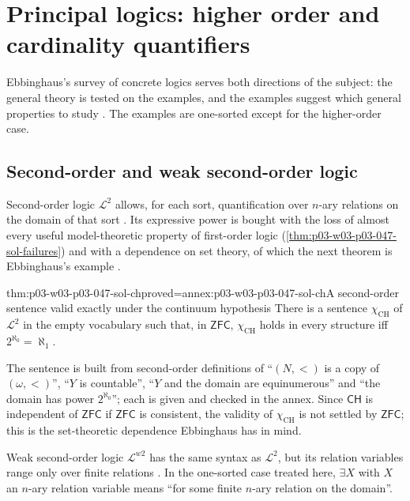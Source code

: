 

\section{Principal logics: higher order and cardinality quantifiers}
\label{sec:p03-w03-p03-047-principal-logics}

Ebbinghaus's survey of concrete logics serves both directions of the
subject: the general theory is tested on the examples, and the examples
suggest which general properties to study
\cite[Ch.~II, \S2, p.~33]{Ebbinghaus1985ExtendedLogics}.  The examples are
one-sorted except for the higher-order case.

\subsection{Second-order and weak second-order logic}

Second-order logic \(\mathscr L^2\) allows, for each sort, quantification
over \(n\)-ary relations on the domain of that sort
\cite[Ch.~II, Definition~2.1.1, p.~33]{Ebbinghaus1985ExtendedLogics}.  Its
expressive power is bought with the loss of almost every useful
model-theoretic property of first-order logic
(\cref{thm:p03-w03-p03-047-sol-failures}) and with a dependence on set
theory, of which the next theorem is Ebbinghaus's example
\cite[Ch.~II, \S2.1, p.~33]{Ebbinghaus1985ExtendedLogics}.

\begin{hbtheorem}{thm:p03-w03-p03-047-sol-ch}{proved=annex:p03-w03-p03-047-sol-ch}{A second-order sentence valid exactly under the continuum hypothesis}
There is a sentence \(\chi_{\mathrm{CH}}\) of \(\mathscr L^2\) in the empty
vocabulary such that, in \(\mathsf{ZFC}\), \(\chi_{\mathrm{CH}}\) holds in every
structure iff \(2^{\aleph_0}=\aleph_1\).
\end{hbtheorem}

The sentence is built from second-order definitions of ``\((N,<)\) is a copy
of \((\omega,<)\)'', ``\(Y\) is countable'', ``\(Y\) and the domain are
equinumerous'' and ``the domain has power \(2^{\aleph_0}\)''; each is given
and checked in the annex.  Since \(\mathsf{CH}\) is independent of
\(\mathsf{ZFC}\) if \(\mathsf{ZFC}\) is consistent, the validity of
\(\chi_{\mathrm{CH}}\) is not settled by \(\mathsf{ZFC}\); this is the
set-theoretic dependence Ebbinghaus has in mind.

Weak second-order logic \(\mathscr L^{w2}\) has the same syntax as
\(\mathscr L^2\), but its relation variables range only over finite
relations \cite[Ch.~II, Definition~2.1.2, p.~33]{Ebbinghaus1985ExtendedLogics}.
In the one-sorted case treated here, \(\exists X\) with \(X\) an \(n\)-ary
relation variable means ``for some finite \(n\)-ary relation on the
domain''.

